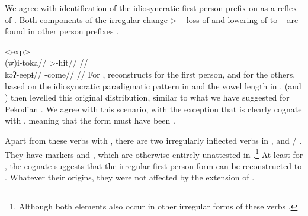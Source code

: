 

We agree with  identification of the idiosyncratic \akuriyo first person prefix  on  as a reflex of .
Both components of the irregular change  >  -- loss of  and lowering of  to  -- are found in other person prefixes .

\pex<exp>
 \akuriyo \parencite[][86]{gildea1994akuriyo}\\
\begingl
\gla (w)i-toka//
\glb {}>-hit//
\glft {}//
\endgl
{} \akuriyo \parencite[][114]{meira1998proto}\\
\begingl
\gla kəʔ-eepɨ//
\glb {}-come//
\glft {}//
\endgl
\xe
%
%
%
%
For , \textcite[114--115]{meira1998proto} reconstructs \PTar {} for the first person, and  for the others, based on the idiosyncratic paradigmatic pattern in \trio and the vowel length in \akuriyo.
\akuriyo (and \carijo) then levelled this original distribution, similar to what we have suggested for Pekodian .
We agree with this scenario, with the exception that \trio {} is clearly cognate with  , meaning that the \PTir form must have been .



Apart from these \PTir verbs with , there are two irregularly inflected  verbs in \trio,   and /  .
They have  markers  and , which are otherwise entirely unattested in \trio.\footnote{Although both elements also occur in other irregular forms of these verbs \parencite[180, 325, 331]{triomeira1999}.}
At least for , the \akuriyo cognate suggests that the irregular first person form  can be reconstructed to \PTir.
Whatever their origins, they were not affected by the extension of .

